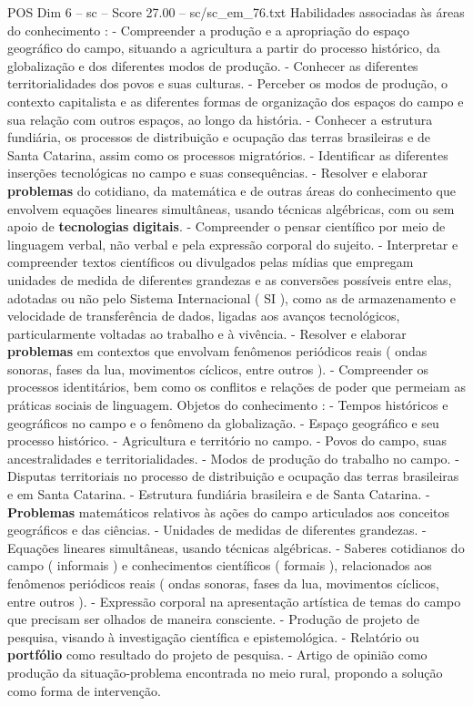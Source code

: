 \begin{textsample}{POS Dim 6 – sc – Score 27.00 – sc/sc\_em\_76.txt}
Habilidades associadas às áreas do conhecimento : - Compreender a produção e a apropriação do espaço geográfico do campo, situando a agricultura a partir do processo histórico, da globalização e dos diferentes modos de produção. - Conhecer as diferentes territorialidades dos povos e suas culturas. - Perceber os modos de produção, o contexto capitalista e as diferentes formas de organização dos espaços do campo e sua relação com outros espaços, ao longo da história. - Conhecer a estrutura fundiária, os processos de distribuição e ocupação das terras brasileiras e de Santa Catarina, assim como os processos migratórios. - Identificar as diferentes inserções tecnológicas no campo e suas consequências. - Resolver e elaborar \textbf{problemas} do cotidiano, da matemática e de outras áreas do conhecimento que envolvem equações lineares simultâneas, usando técnicas algébricas, com ou sem apoio de \textbf{tecnologias} \textbf{digitais}. - Compreender o pensar científico por meio de linguagem verbal, não verbal e pela expressão corporal do sujeito. - Interpretar e compreender textos científicos ou divulgados pelas mídias que empregam unidades de medida de diferentes grandezas e as conversões possíveis entre elas, adotadas ou não pelo Sistema Internacional ( SI ), como as de armazenamento e velocidade de transferência de dados, ligadas aos avanços tecnológicos, particularmente voltadas ao trabalho e à vivência. - Resolver e elaborar \textbf{problemas} em contextos que envolvam fenômenos periódicos reais ( ondas sonoras, fases da lua, movimentos cíclicos, entre outros ). - Compreender os processos identitários, bem como os conflitos e relações de poder que permeiam as práticas sociais de linguagem.
Objetos do conhecimento : - Tempos históricos e geográficos no campo e o fenômeno da globalização. - Espaço geográfico e seu processo histórico. - Agricultura e território no campo. - Povos do campo, suas ancestralidades e territorialidades. - Modos de produção do trabalho no campo. - Disputas territoriais no processo de distribuição e ocupação das terras brasileiras e em Santa Catarina. - Estrutura fundiária brasileira e de Santa Catarina. - \textbf{Problemas} matemáticos relativos às ações do campo articulados aos conceitos geográficos e das ciências. - Unidades de medidas de diferentes grandezas. - Equações lineares simultâneas, usando técnicas algébricas. - Saberes cotidianos do campo ( informais ) e conhecimentos científicos ( formais ), relacionados aos fenômenos periódicos reais ( ondas sonoras, fases da lua, movimentos cíclicos, entre outros ). - Expressão corporal na apresentação artística de temas do campo que precisam ser olhados de maneira consciente. - Produção de projeto de pesquisa, visando à investigação científica e epistemológica. - Relatório ou \textbf{portfólio} como resultado do projeto de pesquisa. - Artigo de opinião como produção da situação-problema encontrada no meio rural, propondo a solução como forma de intervenção.

\end{textsample}
